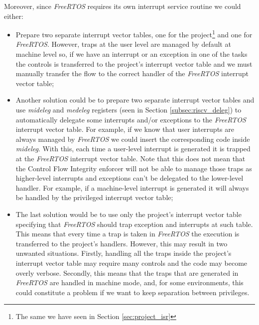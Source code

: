 Moreover, since \textit{FreeRTOS} requires its own interrupt service routine we could
either:
\begin{itemize}
  \item Prepare two separate interrupt vector tables, one for the project\footnote{The
    same we have seen in Section \ref{sec:project_isr}} and one for \textit{FreeRTOS}.
    However, traps at the user level are managed by default at machine level so,
    if we have an interrupt or an exception in one of the tasks the controls is transferred
    to the project's interrupt vector table and we must manually transfer the flow
    to the correct handler of the \textit{FreeRTOS} interrupt vector table;

  \item Another solution could be to prepare two separate interrupt vector tables
    and use \textit{mideleg} and \textit{medeleg} registers (seen in Section
    \ref{subsec:riscv_deleg}) to automatically delegate some interrupts and/or exceptions
    to the \textit{FreeRTOS} interrupt vector table. For example, if we know
    that user interrupts are always managed by \textit{FreeRTOS} we could insert
    the corresponding code inside \textit{mideleg}. With this, each time a user-level
    interrupt is generated it is trapped at the \textit{FreeRTOS} interrupt vector
    table. Note that this does not mean that the Control Flow Integrity enforcer
    will not be able to manage those traps as higher-level interrupts and
    exceptions can't be delegated to the lower-level handler. For example, if a
    machine-level interrupt is generated it will always be handled by the
    privileged interrupt vector table;

  \item The last solution would be to use only the project's interrupt vector table
    specifying that \textit{FreeRTOS} should trap exception and interrupts at
    such table. This means that every time a trap is taken in \textit{FreeRTOS}
    the execution is transferred to the project's handlers. However, this may
    result in two unwanted situations. Firstly, handling all the traps inside
    the project's interrupt vector table may require many controls and the code
    may become overly verbose. Secondly, this means that the traps that are
    generated in \textit{FreeRTOS} are handled in machine mode, and, for some environments,
    this could constitute a problem if we want to keep separation between
    privileges.
\end{itemize}

